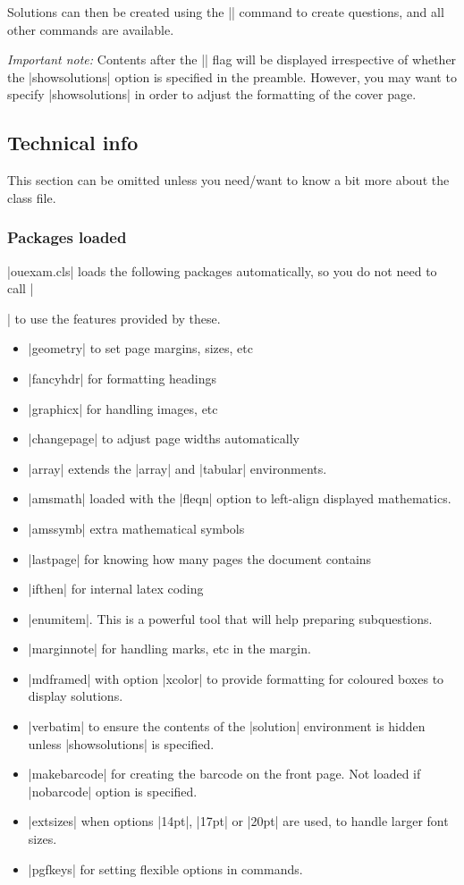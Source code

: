 \documentclass[a4paper]{ltxguide}
\newcommand\3{\unskip\enspace\fbox{\fontsize{4}{4}\selectfont NEW 3.0}}
\begin{document}
Solutions can then be created using the |\question| command to create questions, and all other commands are available.


\emph{Important note:} Contents after the |\solutions| flag will be displayed irrespective of whether the |showsolutions| option is specified in the preamble. However, you may want to specify |showsolutions| in order to adjust the formatting of the cover page.

\subsection{Technical info}
This section can be omitted unless you need/want to know a bit more about the class file.

\subsubsection{Packages loaded}
|ouexam.cls| loads the following packages automatically, so you do not need to call |\usepackage{...}| to use the features provided by these.

\begin{itemize}
\item |geometry| to set page margins, sizes, etc
\item |fancyhdr| for formatting headings
\item |graphicx| for handling images, etc
\item |changepage| to adjust page widths automatically
\item |array| extends the |array| and |tabular| environments.
\item |amsmath| loaded with the |fleqn| option to left-align displayed mathematics.
\item |amssymb| extra mathematical symbols
\item |lastpage| for knowing how many pages the document contains
\item |ifthen| for internal latex coding
\item |enumitem|. This is a powerful tool that will help preparing subquestions.
\item |marginnote| for handling marks, etc in the margin.
\item |mdframed| with option |xcolor| to provide formatting for coloured boxes to display solutions.
\item |verbatim| to ensure the contents of the |solution| environment is hidden unless |showsolutions| is specified.
\item |makebarcode| for creating the barcode on the front page. Not loaded if |nobarcode| option is specified.
\item |extsizes| when options |14pt|, |17pt| or |20pt| are used, to handle larger font sizes. 
\item |pgfkeys| for setting flexible options in commands.
\end{itemize}
\end{document}
